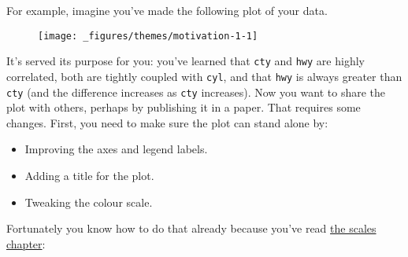 For example, imagine you've made the following plot of your data.

\begin{Shaded}
\begin{Highlighting}[]
\StringTok{ } 
\StringTok{  }\NormalTok{() +}\StringTok{ }
\StringTok{  }\NormalTok{(} \NormalTok{, } \NormalTok{)}
\end{Highlighting}
\end{Shaded}

\begin{figure}[H]
  \centering
  \texttt{[image: \_figures/themes/motivation-1-1]}
\end{figure}

It's served its purpose for you: you've learned that \texttt{cty} and
\texttt{hwy} are highly correlated, both are tightly coupled with
\texttt{cyl}, and that \texttt{hwy} is always greater than \texttt{cty}
(and the difference increases as \texttt{cty} increases). Now you want
to share the plot with others, perhaps by publishing it in a paper. That
requires some changes. First, you need to make sure the plot can stand
alone by:

\begin{itemize}
\tightlist
\item
  Improving the axes and legend labels.
\item
  Adding a title for the plot.
\item
  Tweaking the colour scale.
\end{itemize}

Fortunately you know how to do that already because you've read
\hyperref[cha:scales]{the scales chapter}:

\begin{Shaded}
\begin{Highlighting}[]
\StringTok{ }
\StringTok{  }\NormalTok{(}
     \NormalTok{,}
     \NormalTok{,}
     \NormalTok{,}
     
  \NormalTok{) +}
\StringTok{  }\NormalTok{(} \NormalTok{, } \NormalTok{)}
\end{Highlighting}
\end{Shaded}

